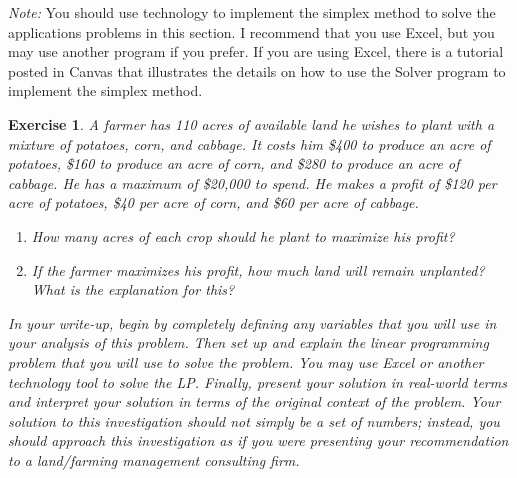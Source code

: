 \documentclass[letterpaper,10pt]{article}
\newtheorem{ex}{Exercise}
\begin{document}
{\em Note:}  You should use technology to implement the simplex method to solve the applications problems in this section.  I recommend that you use Excel, but you may use another program if you prefer.  If you are using Excel, there is a tutorial posted in Canvas that illustrates the details on how to use the Solver program to implement the simplex method.

\begin{ex}
A farmer has 110 acres of available land he wishes to plant with a mixture of potatoes, corn, and cabbage. It costs him \$400 to produce an acre of potatoes, \$160 to produce an acre of corn, and \$280 to produce an acre of cabbage. He has a maximum of \$20,000 to spend. He makes a profit of \$120 per acre of potatoes, \$40
per acre of corn, and \$60 per acre of cabbage.
\begin{enumerate}
\item[(a)] How many acres of each crop should he plant to maximize his profit?
\item[(b)] If the farmer maximizes his profit, how much land will remain unplanted? What is the explanation for this?

\end{enumerate}
In your write-up, begin by completely defining any variables that you will use in your analysis of this problem.  Then set up and explain the linear programming problem that you will use to solve the problem.  You may use Excel or another technology tool to solve the LP.  Finally, present your solution in real-world terms and interpret your solution in terms of the original context of the problem.  Your solution to this investigation should not simply be a set of numbers; instead, you should approach this investigation as if you were presenting your recommendation to a land/farming management consulting firm.
\end{ex}
\end{document}
